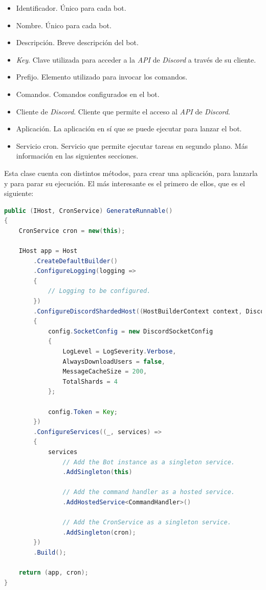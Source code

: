 \begin{itemize}
	\item Identificador. Único para cada bot.
	\item Nombre. Único para cada bot.
	\item Descripción. Breve descripción del bot.
	\item \textit{Key}. Clave utilizada para acceder a la \textit{API} de \textit{Discord} a través de su cliente.
	\item Prefijo. Elemento utilizado para invocar los comandos.
	\item Comandos. Comandos configurados en el bot.
	\item Cliente de \textit{Discord}. Cliente que permite el acceso al \textit{API} de \textit{Discord}.
	\item Aplicación. La aplicación en sí que se puede ejecutar para lanzar el bot.
	\item Servicio cron. Servicio que permite ejecutar tareas en segundo plano. Más información en las siguientes secciones.
\end{itemize}

Esta clase cuenta con distintos métodos, para crear una aplicación, para lanzarla y para parar su ejecución. El más interesante es el primero de ellos, que es el siguiente:

\begin{lstlisting}[language=java]
public (IHost, CronService) GenerateRunnable()
{
    CronService cron = new(this);

    IHost app = Host
        .CreateDefaultBuilder()
        .ConfigureLogging(logging =>
        {
            // Logging to be configured.
        })
        .ConfigureDiscordShardedHost((HostBuilderContext context, DiscordHostConfiguration config) =>
        {
            config.SocketConfig = new DiscordSocketConfig
            {
                LogLevel = LogSeverity.Verbose,
                AlwaysDownloadUsers = false,
                MessageCacheSize = 200,
                TotalShards = 4
            };

            config.Token = Key;
        })
        .ConfigureServices((_, services) =>
        {
            services
                // Add the Bot instance as a singleton service.
                .AddSingleton(this)

                // Add the command handler as a hosted service.
                .AddHostedService<CommandHandler>()

                // Add the CronService as a singleton service.
                .AddSingleton(cron);
        })
        .Build();

    return (app, cron);
}
\end{lstlisting}

